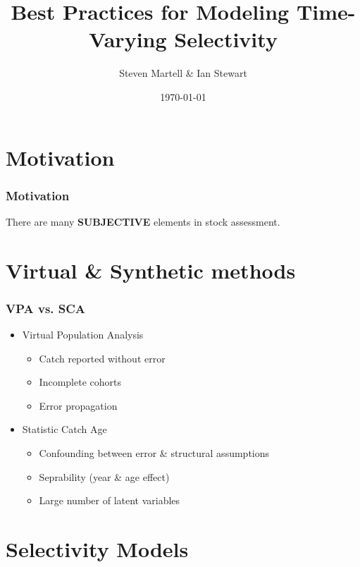 \documentclass{beamer}
\title[IPHC]{Best Practices for Modeling Time-Varying Selectivity}
\author[Martell \& Stewart]{Steven Martell \& Ian Stewart}
\institute[IPHC]
{
International Pacific Halibut Commission\\
\medskip
{\emph{stevem@iphc.int}}
}
\date{\today}
\begin{document}
%
\begin{frame}
\titlepage
\end{frame}
%
\section{Motivation} %
\label{sec:motivation}

\begin{frame}
\frametitle{Motivation}

	
\begin{center}
	There are many \textbf{SUBJECTIVE} elements in stock assessment.
\end{center}

\end{frame}

\section{Virtual \& Synthetic methods} %
\label{sec:virtual_&_synthetic_methods}

\begin{frame}[m]\frametitle{VPA vs. SCA}

\begin{itemize}

	\item \alert<1>{Virtual Population Analysis}
		\begin{itemize}[<+->]
			\item Catch reported without error
			\item Incomplete cohorts
			\item Error propagation
		\end{itemize}
\vfill
	\item \alert<4>{Statistic Catch Age }
		\begin{itemize}[<+->]
			\item Confounding between error \& structural assumptions
			\item Seprability (year \& age effect)
			\item Large number of latent variables
		\end{itemize}
\end{itemize}
    


\end{frame}


\section{Selectivity Models} %
\label{sec:Selectivity_Models}
\end{document}
